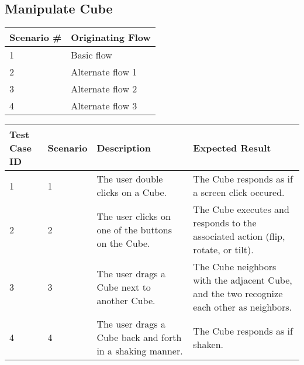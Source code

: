 \documentclass[12pt]{article}
\begin{document}
\clearpage

\subsection{Manipulate Cube}

\begin{table}[h!]
  \begin{tabular}{l | l}
    \textbf{Scenario \#} &
    \textbf{Originating Flow} \\ \hline

    1 &
    Basic flow \\ \hline

    2 &
    Alternate flow 1 \\ \hline

    3 &
    Alternate flow 2 \\ \hline

    4 &
    Alternate flow 3 \\ \hline

  \end{tabular}
\end{table}

\begin{table}[h!]
  \begin{tabular}{p{.5in} | p{.75in} | p{2.15in} | p{2.15in}}
    \textbf{Test Case ID} &
    \textbf{Scenario} &
    \textbf{Description} &
    \textbf{Expected Result} \\ \hline

    1 &
    1 &
    The user double clicks on a Cube. &
    The Cube responds as if a screen click occured. \\ \hline

    2 &
    2 &
    The user clicks on one of the buttons on the Cube. &
    The Cube executes and responds to the associated action (flip, rotate, or tilt). \\ \hline

    3 &
    3 &
    The user drags a Cube next to another Cube. &
    The Cube neighbors with the adjacent Cube, and the two recognize each other as neighbors. \\ \hline

    4 &
    4 &
    The user drags a Cube back and forth in a shaking manner. &
    The Cube responds as if shaken. \\ \hline

  \end{tabular}
\end{table}
        
\end{document}

